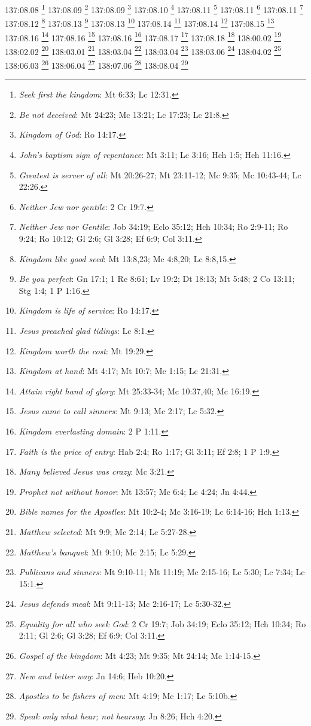 {{{{{{{{{{{{{{{{{{{{{{{{{{{{{{{{{{137:08.08 \footnote{\textit{Seek first the kingdom}: Mt 6:33; Lc 12:31.}
137:08.09 \footnote{\textit{Be not deceived}: Mt 24:23; Mc 13:21; Lc 17:23; Lc 21:8.}
137:08.09 \footnote{\textit{Kingdom of God}: Ro 14:17.}
137:08.10 \footnote{\textit{John's baptism sign of repentance}: Mt 3:11; Lc 3:16; Hch 1:5; Hch 11:16.}
137:08.11 \footnote{\textit{Greatest is server of all}: Mt 20:26-27; Mt 23:11-12; Mc 9:35; Mc 10:43-44; Lc 22:26.}
137:08.11 \footnote{\textit{Neither Jew nor gentile}: 2 Cr 19:7.}
137:08.11 \footnote{\textit{Neither Jew nor Gentile}: Job 34:19; Eclo 35:12; Hch 10:34; Ro 2:9-11; Ro 9:24; Ro 10:12; Gl 2:6; Gl 3:28; Ef 6:9; Col 3:11.}
137:08.12 \footnote{\textit{Kingdom like good seed}: Mt 13:8,23; Mc 4:8,20; Lc 8:8,15.}
137:08.13 \footnote{\textit{Be you perfect}: Gn 17:1; 1 Re 8:61; Lv 19:2; Dt 18:13; Mt 5:48; 2 Co 13:11; Stg 1:4; 1 P 1:16.}
137:08.13 \footnote{\textit{Kingdom is life of service}: Ro 14:17.}
137:08.14 \footnote{\textit{Jesus preached glad tidings}: Lc 8:1.}
137:08.14 \footnote{\textit{Kingdom worth the cost}: Mt 19:29.}
137:08.15 \footnote{\textit{Kingdom at hand}: Mt 4:17; Mt 10:7; Mc 1:15; Lc 21:31.}
137:08.16 \footnote{\textit{Attain right hand of glory}: Mt 25:33-34; Mc 10:37,40; Mc 16:19.}
137:08.16 \footnote{\textit{Jesus came to call sinners}: Mt 9:13; Mc 2:17; Lc 5:32.}
137:08.16 \footnote{\textit{Kingdom everlasting domain}: 2 P 1:11.}
137:08.17 \footnote{\textit{Faith is the price of entry}: Hab 2:4; Ro 1:17; Gl 3:11; Ef 2:8; 1 P 1:9.}
137:08.18 \footnote{\textit{Many believed Jesus was crazy}: Mc 3:21.}
138:00.02 \footnote{\textit{Prophet not without honor}: Mt 13:57; Mc 6:4; Lc 4:24; Jn 4:44.}
138:02.02 \footnote{\textit{Bible names for the Apostles}: Mt 10:2-4; Mc 3:16-19; Lc 6:14-16; Hch 1:13.}
138:03.01 \footnote{\textit{Matthew selected}: Mt 9:9; Mc 2:14; Lc 5:27-28.}
138:03.04 \footnote{\textit{Matthew's banquet}: Mt 9:10; Mc 2:15; Lc 5:29.}
138:03.04 \footnote{\textit{Publicans and sinners}: Mt 9:10-11; Mt 11:19; Mc 2:15-16; Lc 5:30; Lc 7:34; Lc 15:1.}
138:03.06 \footnote{\textit{Jesus defends meal}: Mt 9:11-13; Mc 2:16-17; Lc 5:30-32.}
138:04.02 \footnote{\textit{Equality for all who seek God}: 2 Cr 19:7; Job 34:19; Eclo 35:12; Hch 10:34; Ro 2:11; Gl 2:6; Gl 3:28; Ef 6:9; Col 3:11.}
138:06.03 \footnote{\textit{Gospel of the kingdom}: Mt 4:23; Mt 9:35; Mt 24:14; Mc 1:14-15.}
138:06.04 \footnote{\textit{New and better way}: Jn 14:6; Heb 10:20.}
138:07.06 \footnote{\textit{Apostles to be fishers of men}: Mt 4:19; Mc 1:17; Lc 5:10b.}
138:08.04 \footnote{\textit{Speak only what hear; not hearsay}: Jn 8:26; Hch 4:20.}
}}}}}}}}}}}}}}}}}}}}}}}}}}}}}}}}}}
